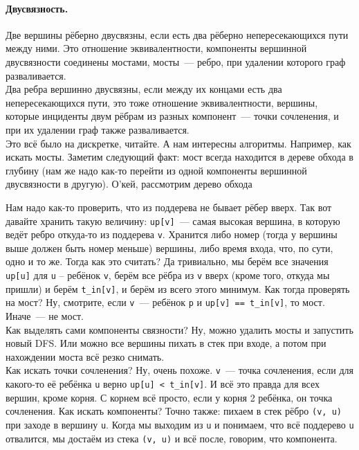 \documentclass{article}
\begin{document}
    \paragraph{Двусвязность.}
    Две вершины рёберно двусвязны, если есть два рёберно непересекающихся пути между ними. Это отношение эквивалентности, компоненты вершинной двусвязности соединены мостами, мосты~--- ребро, при удалении которого граф разваливается.\\
    Два ребра вершинно двусвязны, если между их концами есть два непересекающихся пути, это тоже отношение эквивалентности, вершины, которые инциденты двум рёбрам из разных компонент~--- точки сочленения, и при их удалении граф также разваливается.\\
    Это всё было на дискретке, читайте. А нам интересны алгоритмы. Например, как искать мосты. Заметим следующий факт: мост всегда находится в дереве обхода в глубину (нам же надо как-то перейти из одной компоненты вершинной двусвязности в другую). О'кей, рассмотрим дерево обхода
    \begin{figure}[H]
    \end{figure}\noindent
    Нам надо как-то проверить, что из поддерева не бывает рёбер вверх. Так вот давайте хранить такую величину: \texttt{up[v]}~--- самая высокая вершина, в которую ведёт ребро откуда-то из поддерева \texttt{v}. Хранится либо номер (тогда у вершины выше должен быть номер меньше) вершины, либо время входа, что, по сути, одно и то же. Тогда как это считать? Да тривиально, мы берём все значения \texttt{up[u]} для \texttt{u} -- ребёнок \texttt{v}, берём все рёбра из \texttt{v} вверх (кроме того, откуда мы пришли) и берём \texttt{t_in[v]}, и берём из всего этого минимум. Как тогда проверять на мост? Ну, смотрите, если \texttt{v}~--- ребёнок \texttt{p} и \texttt{up[v] == t_in[v]}, то мост. Иначе~--- не мост.\\
    Как выделять сами компоненты связности? Ну, можно удалить мосты и запустить новый DFS. Или можно все вершины пихать в стек при входе, а потом при нахождении моста всё резко снимать.\\
    Как искать точки сочленения? Ну, очень похоже. \texttt{v}~--- точка сочленения, если для какого-то её ребёнка \texttt{u} верно \texttt{up[u] < t_in[v]}. И всё это правда для всех вершин, кроме корня. С корнем всё просто, если у корня 2 ребёнка, он точка сочленения. Как искать компоненты? Точно также: пихаем в стек рёбро \texttt{(v, u)} при заходе в вершину \texttt{u}. Когда мы выходим из \texttt{u} и понимаем, что всё поддерево \texttt{u} отвалится, мы достаём из стека \texttt{(v, u)} и всё после, говорим, что компонента.
\end{document}
